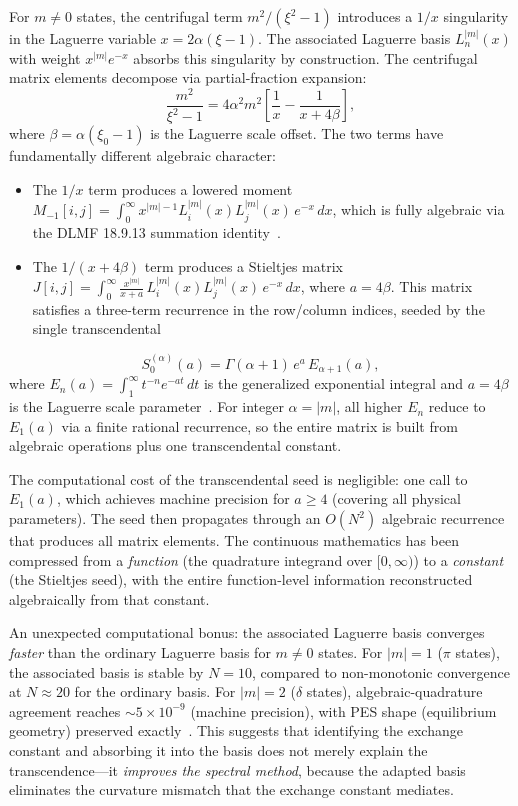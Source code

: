 \documentclass[aps,pra,twocolumn,superscriptaddress,longbibliography]{revtex4-2}
\begin{document}
For $m \neq 0$ states, the centrifugal term $m^2/(\xi^2 - 1)$
introduces a $1/x$ singularity in the Laguerre variable
$x = 2\alpha(\xi - 1)$.  The associated Laguerre basis
$L_n^{|m|}(x)$ with weight $x^{|m|} e^{-x}$ absorbs this
singularity by construction.  The centrifugal matrix elements
decompose via partial-fraction expansion:
\begin{equation}
  \frac{m^2}{\xi^2 - 1}
  = 4\alpha^2 m^2 \left[\frac{1}{x}
    - \frac{1}{x + 4\beta}\right],
  \label{eq:partial_fraction}
\end{equation}
where $\beta = \alpha(\xi_0 - 1)$ is the Laguerre scale offset.
The two terms have fundamentally different algebraic character:
\begin{itemize}
  \item The $1/x$ term produces a lowered moment
    $M_{-1}[i,j] = \int_0^\infty x^{|m|-1} L_i^{|m|}(x)
    L_j^{|m|}(x)\,e^{-x}\,dx$, which is fully algebraic via
    the DLMF 18.9.13 summation
    identity~\cite{dlmf_laguerre}.
  \item The $1/(x + 4\beta)$ term produces a Stieltjes matrix
    $J[i,j] = \int_0^\infty \frac{x^{|m|}}{x + a}\,
    L_i^{|m|}(x) L_j^{|m|}(x)\,e^{-x}\,dx$, where $a = 4\beta$.
    This matrix satisfies a three-term recurrence in the
    row/column indices, seeded by the single transcendental
\end{itemize}
\begin{equation}
  S_0^{(\alpha)}(a) = \Gamma(\alpha+1)\,e^a\,E_{\alpha+1}(a),
  \label{eq:stieltjes_seed}
\end{equation}
where $E_n(a) = \int_1^\infty t^{-n} e^{-at}\,dt$ is the
generalized exponential integral and $a = 4\beta$ is the
Laguerre scale parameter~\cite{loutey_track_j}.  For integer
$\alpha = |m|$, all higher $E_n$ reduce to $E_1(a)$ via a
finite rational recurrence, so the entire matrix is built from
algebraic operations plus one transcendental constant.

The computational cost of the transcendental seed is negligible:
one call to $E_1(a)$, which achieves machine precision for
$a \ge 4$ (covering all physical parameters).  The seed then
propagates through an $O(N^2)$ algebraic recurrence that produces
all matrix elements.  The continuous mathematics has been
compressed from a \textit{function} (the quadrature integrand
over $[0,\infty)$) to a \textit{constant} (the Stieltjes seed),
with the entire function-level information reconstructed
algebraically from that constant.

An unexpected computational bonus: the associated Laguerre basis
converges \textit{faster} than the ordinary Laguerre basis for
$m \neq 0$ states.  For $|m| = 1$ ($\pi$ states), the associated
basis is stable by $N = 10$, compared to non-monotonic convergence
at $N \approx 20$ for the ordinary basis.  For $|m| = 2$
($\delta$ states), algebraic-quadrature agreement reaches
$\sim 5 \times 10^{-9}$ (machine precision), with PES shape
(equilibrium geometry) preserved exactly~\cite{loutey_track_j}.
This suggests that identifying the exchange constant and absorbing
it into the basis does not merely explain the transcendence---it
\textit{improves the spectral method}, because the adapted basis
eliminates the curvature mismatch that the exchange constant
mediates.
\end{document}
